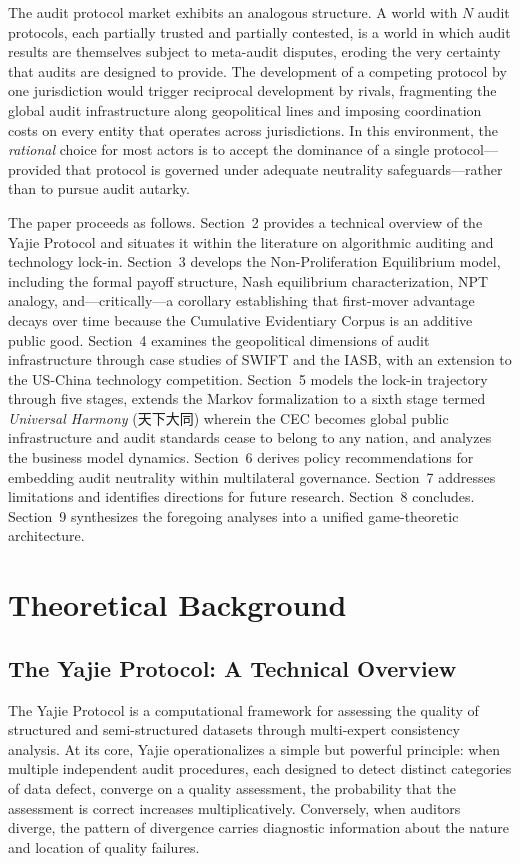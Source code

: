 \documentclass[12pt,a4paper]{ctexart}
\theoremstyle{definition}
\theoremstyle{remark}
\begin{document}
The audit protocol market exhibits an analogous structure. A world with $N$ audit protocols, each partially trusted and partially contested, is a world in which audit results are themselves subject to meta-audit disputes, eroding the very certainty that audits are designed to provide. The development of a competing protocol by one jurisdiction would trigger reciprocal development by rivals, fragmenting the global audit infrastructure along geopolitical lines and imposing coordination costs on every entity that operates across jurisdictions. In this environment, the \textit{rational} choice for most actors is to accept the dominance of a single protocol—provided that protocol is governed under adequate neutrality safeguards—rather than to pursue audit autarky.

The paper proceeds as follows. Section~2 provides a technical overview of the Yajie Protocol and situates it within the literature on algorithmic auditing and technology lock-in. Section~3 develops the Non-Proliferation Equilibrium model, including the formal payoff structure, Nash equilibrium characterization, NPT analogy, and—critically—a corollary establishing that first-mover advantage decays over time because the Cumulative Evidentiary Corpus is an additive public good. Section~4 examines the geopolitical dimensions of audit infrastructure through case studies of SWIFT and the IASB, with an extension to the US-China technology competition. Section~5 models the lock-in trajectory through five stages, extends the Markov formalization to a sixth stage termed \textit{Universal Harmony} (天下大同) wherein the CEC becomes global public infrastructure and audit standards cease to belong to any nation, and analyzes the business model dynamics. Section~6 derives policy recommendations for embedding audit neutrality within multilateral governance. Section~7 addresses limitations and identifies directions for future research. Section~8 concludes. Section~9 synthesizes the foregoing analyses into a unified game-theoretic architecture.

\section{Theoretical Background}

\subsection{The Yajie Protocol: A Technical Overview}

The Yajie Protocol is a computational framework for assessing the quality of structured and semi-structured datasets through multi-expert consistency analysis. At its core, Yajie operationalizes a simple but powerful principle: when multiple independent audit procedures, each designed to detect distinct categories of data defect, converge on a quality assessment, the probability that the assessment is correct increases multiplicatively. Conversely, when auditors diverge, the pattern of divergence carries diagnostic information about the nature and location of quality failures.
\end{document}
